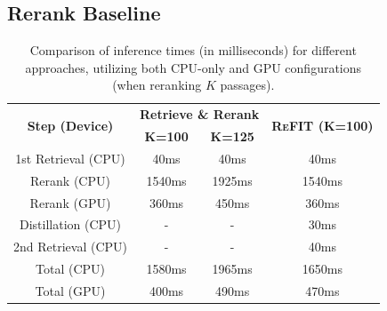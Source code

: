 \subsection{Rerank Baseline}
\begin{table}
\small
\setlength{\tabcolsep}{1.0em}
        \centering
        \def\arraystretch{1.3}
        \begin{tabular}{c|cc|c}
        \hline
        \multirow{2}{*}{\textbf{Step (Device)}} & \multicolumn{2}{c}{\textbf{Retrieve \& Rerank}} & \multirow{2}{*}{\parbox{3em}{\centering\textbf{\textsc{ReFIT} (K=100)}}}\\
        \cline{2-3}
        & \multicolumn{1}{|c}{\textbf{K=100}} & \multicolumn{1}{c|}{\textbf{K=125}} & \\
        \hline
        1st Retrieval (CPU) & \multicolumn{1}{c}{40ms} & \multicolumn{1}{c|}{40ms} & \multicolumn{1}{c}{40ms} \\
        \hdashline
        Rerank (CPU) & \multicolumn{1}{c}{1540ms} & \multicolumn{1}{c|}{1925ms} & \multicolumn{1}{c}{1540ms} \\
        Rerank (GPU) & \multicolumn{1}{c}{360ms} & \multicolumn{1}{c|}{450ms} & \multicolumn{1}{c}{360ms} \\
        \hdashline
        Distillation (CPU) & \multicolumn{1}{c}{-} & \multicolumn{1}{c|}{-}&  \multicolumn{1}{c}{30ms}\\
        2nd Retrieval (CPU) & \multicolumn{1}{c}{-} & \multicolumn{1}{c|}{-} & \multicolumn{1}{c}{40ms}\\
        \hline
        Total (CPU) & \multicolumn{1}{c}{1580ms}&  \multicolumn{1}{c|}{1965ms} & \multicolumn{1}{c}{1650ms}\\
        Total (GPU) & \multicolumn{1}{c}{400ms}&  \multicolumn{1}{c|}{490ms} & \multicolumn{1}{c}{470ms}\\
        \hline
        \end{tabular}
        \caption{Comparison of inference times (in milliseconds) for different approaches, utilizing both CPU-only and GPU configurations (when reranking $K$ passages).}
        \label{tab:inf_times}
        \vspace{-1em}    
\end{table}

